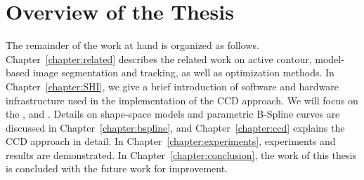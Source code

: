 

\section{Overview of the Thesis}
\label{sec:overview}
The remainder of the work at hand is organized as
follows. Chapter~\ref{chapter:related} describes the related work on
active contour, model-based image segmentation and tracking, as well
as optimization methods. In Chapter~\ref{chapter:SHI}, we give a brief introduction of software
and hardware infrastructure used in the implementation of the CCD
approach. We will focus on the ,  and . Details on shape-space models and parametric
B-Spline curves are discussed in Chapter~\ref{chapter:bspline},  and
Chapter~\ref{chapter:ccd} explains the CCD approach in detail. 
In Chapter~\ref{chapter:experiments}, experiments and results are demonstrated.%
In Chapter~\ref{chapter:conclusion},
the work of this thesis is concluded with the future work for improvement.



